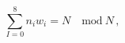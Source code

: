 \begin{equation}  \label{Kacond_w0}
\sum_{I = 0}^{8} n_i w_i = N \quad \mbox{mod}\ N\,,
\end{equation}

